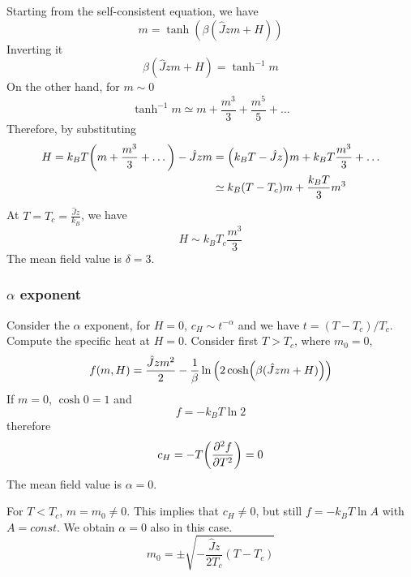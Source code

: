 \documentclass[../main/main.tex]{subfiles}
\begin{document}
Starting from the self-consistent equation, we have
\begin{equation}
  m = \tanh (\beta (\hat{J}zm+H ))
  \label{eq:12_1}
\end{equation}
Inverting it
\begin{equation}
  \beta (\hat{J}zm+H ) = \tanh^{-1} m
\end{equation}
On the other hand, for \( m \sim 0 \)
\begin{equation}
  \tanh^{-1} m \simeq m + \frac{m^3}{3} + \frac{m^5}{5} + \dots
\end{equation}
Therefore, by substituting
\begin{equation}
\begin{split}
  H  = k_B T \qty(m+ \frac{m^3}{3} + \dots) - \hat{J} z m
    &= \qty(k_B T - \hat{J}z) m + k_B T \frac{m^3}{3} + \dots \\
    & \simeq k_B (T-T_c)m + \frac{k_B T}{3}m^3
\end{split}
\end{equation}
At \( T=T_c= \frac{\hat{J}z }{k_B} \), we have
\begin{equation}
  H \sim k_B T_c \frac{m^3}{3}
\end{equation}
The mean field value is \( \delta =3 \).


\subsubsection{\( \alpha  \) exponent}
Consider the \( \alpha  \) exponent, for  \( H=0 \), \( c_H \sim t^{-\alpha } \) and we have \( t = (T-T_c)/T_c \).
Compute the specific heat at \( H=0 \).
Consider first \( T>T_c \), where \( m_0 =0 \),
\begin{equation}
  f(m,H) = \frac{\hat{J}zm^2 }{2} - \frac{1}{\beta } \ln{\qty(2\cosh(\beta (\hat{J}zm+H ))) }
\end{equation}
If \( m=0 \), \( \cosh 0 =1 \) and
\begin{equation}
  f = -k_B T \ln{2}
\end{equation}
therefore
\begin{equation}
  c_H = - T \qty(\pdv[2]{f}{T} ) = 0
\end{equation}
The mean field value is \( \alpha =0 \).
\begin{remark}
For \( T<T_c \), \( m=m_0 \neq 0 \). This implies that \( c_H \neq 0 \), but still \( f=-k_BT \ln{A}  \) with \( A= const \). We obtain \( \alpha =0 \) also in this case.
\begin{equation}
  m_0 = \pm \sqrt{- \frac{\hat{J} z}{2T_c}(T-T_c)}
\end{equation}
\end{remark}
\end{document}
